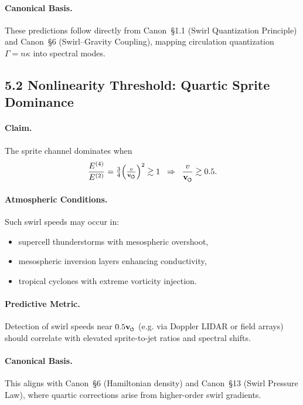\documentclass[reprint,aps,onecolumn,nofootinbib]{revtex4-2}
\newcommand{\swirlarrow}{%
    \mathchoice{\mkern-2mu\scriptstyle\boldsymbol{\circlearrowleft}}%
    {\mkern-2mu\scriptstyle\boldsymbol{\circlearrowleft}}%
    {\mkern-2mu\scriptscriptstyle\boldsymbol{\circlearrowleft}}%
    {\mkern-2mu\scriptscriptstyle\boldsymbol{\circlearrowleft}}%
}
\newcommand{\vswirl}{\mathbf{v}_{\swirlarrow}}
\newcommand{\Ce}{\vswirl}
\begin{document}
    \paragraph{Canonical Basis.}
        These predictions follow directly from Canon~§1.1 (Swirl
        Quantization Principle) and Canon~§6 (Swirl–Gravity Coupling),
        mapping circulation quantization $\Gamma=n\kappa$ into spectral modes.

\subsection*{5.2 Nonlinearity Threshold: Quartic Sprite Dominance}

\paragraph{Claim.}
    The sprite channel dominates when
    \begin{equation}
    \frac{E^{(4)}}{E^{(2)}} = \tfrac{3}{4}\Big(\tfrac{v}{\Ce}\Big)^2 \gtrsim 1
    \;\;\Rightarrow\;\;
    \frac{v}{\Ce} \gtrsim 0.5.
    \end{equation}

\paragraph{Atmospheric Conditions.}
    Such swirl speeds may occur in:
    \begin{itemize}
    \item supercell thunderstorms with mesospheric overshoot,
    \item mesospheric inversion layers enhancing conductivity,
    \item tropical cyclones with extreme vorticity injection.
    \end{itemize}

\paragraph{Predictive Metric.}
    Detection of swirl speeds near $0.5\Ce$ (e.g. via Doppler LIDAR
    or field arrays) should correlate with elevated sprite-to-jet
    ratios and spectral shifts.

\paragraph{Canonical Basis.}
    This aligns with Canon~§6 (Hamiltonian density) and
    Canon~§13 (Swirl Pressure Law), where quartic corrections
    arise from higher-order swirl gradients.
\end{document}
